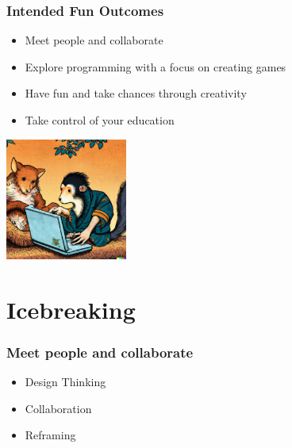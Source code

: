 \documentclass[10pt]{beamer}
\begin{document}

\begin{frame}
 \frametitle{Intended Fun Outcomes}
   \begin{itemize}
    \item{Meet people and collaborate}
    \item {Explore programming with a focus on creating games}
    \item{Have fun and take chances through creativity}
    \item Take control of your education
   \end{itemize}
     \hspace{8 em}
\begin{minipage}{0.4\linewidth} 
      \includegraphics[height=4cm]{images/happy_coders}
\end{minipage}

\end{frame}


\section{Icebreaking}
\begin{frame}
 \frametitle{Meet people and collaborate}
 \begin{itemize}
   \item {Design Thinking}
    \item{Collaboration}
    \item{Reframing}
 \end{itemize}
\end{frame}

\end{document}
